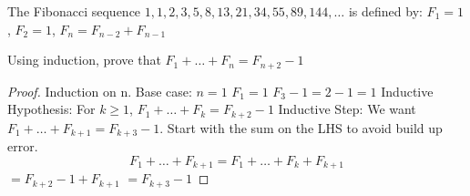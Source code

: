 \question The Fibonacci sequence $1, 1, 2, 3, 5, 8, 13, 21, 34, 55, 89,
 144, \dotsc$ is defined by: \newline
	$F_1 = 1$, $F_2 = 1$, $F_n = F_{n-2} + F_{n-1}$  \newline

Using induction, prove that $F_1 + \dotsc + F_n = F_{n+2} - 1$

\begin{solution}[2 in]
\begin{proof}
Induction on n. \newline
Base case: $n = 1$ \newline
	\tab $F_1 = 1$\newline 
	\tab $F_3 - 1 = 2 - 1 = 1 $ \newline
Inductive Hypothesis: For $k \geq 1$, $F_1 + \dotsc + F_k = F_{k+2} 
- 1$\newline
Inductive Step: We want $F_1 + \dotsc + F_{k+1} = F_{k+3} - 1$. 
Start with the sum on the LHS to avoid build up error.
\[F_1 + \dotsc + F_{k+1} = F_1 + \dotsc + F_k + F_{k+1}\]
\tab \tab  \tab 	   \tab     \tab   \tab  \tab    $= F_{k+2} - 1 
+ F_{k+1}$ \newline
\tab \tab   \tab      \tab    \tab  \tab   \tab  $= F_{k+3} - 1$
\end{proof}
\end{solution}